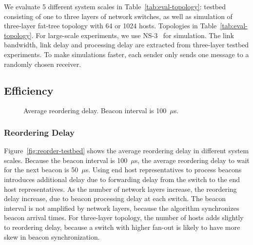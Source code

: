 We evaluate 5 different system scales in Table~\ref{tab:eval-topology}: testbed consisting of one to three layers of network switches, as well as simulation of three-layer fat-tree topology with 64 or 1024 hosts.
Topologies in Table~\ref{tab:eval-topology}.
For large-scale experiments, we use NS-3~\cite{henderson2008network} for simulation. The link bandwidth, link delay and processing delay are extracted from three-layer testbed experiments. To make simulations faster, each sender only sends one message to a randomly chosen receiver.

\subsection{Efficiency}



\begin{figure}[t]
\centering
	\hspace{0.01\textwidth}
	\caption{Average reordering delay. Beacon interval is 100~$\mu$s.}
    \vspace{-5pt}
\label{fig:reorder-delay}
\end{figure}

\subsubsection{Reordering Delay}
\label{sec:eval-delay}

Figure~\ref{fig:reorder-testbed} shows the average reordering delay in different system scales. Because the beacon interval is 100~$\mu$s, the average reordering delay to wait for the next beacon is 50~$\mu$s. Using end host representatives to process beacons introduces additional delay due to forwarding delay from the switch to the end host representatives. As the number of network layers increase, the reordering delay increase, due to beacon processing delay at each switch. The beacon interval is not amplified by network layers, because the algorithm synchronizes beacon arrival times. For three-layer topology, the number of hosts adds slightly to reordering delay, because a switch with higher fan-out is likely to have more skew in beacon synchronization.

